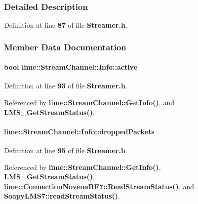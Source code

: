 \subsubsection{Detailed Description}


Definition at line {\bf 87} of file {\bf Streamer.\+h}.



\subsubsection{Member Data Documentation}
\paragraph[{active}]{\setlength{\rightskip}{0pt plus 5cm}bool lime\+::\+Stream\+Channel\+::\+Info\+::active}\label{structlime_1_1StreamChannel_1_1Info_adbda4a1d7b8d723d4f2e734e47de4442}


Definition at line {\bf 93} of file {\bf Streamer.\+h}.



Referenced by {\bf lime\+::\+Stream\+Channel\+::\+Get\+Info()}, and {\bf L\+M\+S\+\_\+\+Get\+Stream\+Status()}.

\paragraph[{dropped\+Packets}]{ lime\+::\+Stream\+Channel\+::\+Info\+::dropped\+Packets}\label{structlime_1_1StreamChannel_1_1Info_abe8d36d5766cc69c70fba2ce7a29cb5f}


Definition at line {\bf 95} of file {\bf Streamer.\+h}.



Referenced by {\bf lime\+::\+Stream\+Channel\+::\+Get\+Info()}, {\bf L\+M\+S\+\_\+\+Get\+Stream\+Status()}, {\bf lime\+::\+Connection\+Novena\+R\+F7\+::\+Read\+Stream\+Status()}, and {\bf Soapy\+L\+M\+S7\+::read\+Stream\+Status()}.

